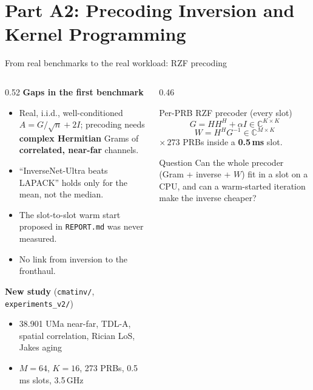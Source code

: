 \documentclass[aspectratio=169,11pt,xcolor=table]{beamer}
\begin{document}
\section{Part A2: Precoding Inversion and Kernel Programming}

\begin{frame}{From real benchmarks to the real workload: RZF precoding}
  \footnotesize
  \begin{columns}[T]
    \begin{column}{0.52\textwidth}
      \textbf{Gaps in the first benchmark}
      \begin{itemize}\footnotesize
        \item Real, i.i.d., well-conditioned $A = G/\sqrt n + 2I$; precoding needs \textbf{complex Hermitian} Grams of \textbf{correlated, near-far} channels.
        \item ``InverseNet-Ultra beats LAPACK'' holds only for the mean, not the median.
        \item The slot-to-slot warm start proposed in \texttt{REPORT.md} was never measured.
        \item No link from inversion to the fronthaul.
      \end{itemize}
      \textbf{New study} (\texttt{cmatinv/}, \texttt{experiments\_v2/})
      \begin{itemize}\footnotesize
        \item 38.901 UMa near-far, TDL-A, spatial correlation, Rician LoS, Jakes aging
        \item $M{=}64$, $K{=}16$, 273 PRBs, 0.5\,ms slots, 3.5\,GHz
      \end{itemize}
    \end{column}
    \begin{column}{0.46\textwidth}
      \begin{block}{Per-PRB RZF precoder (every slot)}
        \[
          G = HH^H + \alpha I \in \mathbb{C}^{K\times K}
        \]
        \[
          W = H^H G^{-1} \in \mathbb{C}^{M\times K}
        \]
        $\times\,273$ PRBs inside a \textbf{0.5\,ms} slot.
      \end{block}
      \begin{alertblock}{Question}
        Can the whole precoder (Gram + inverse + $W$) fit in a slot on a CPU, and can a warm-started iteration make the inverse cheaper?
      \end{alertblock}
    \end{column}
  \end{columns}
\end{frame}
\end{document}
